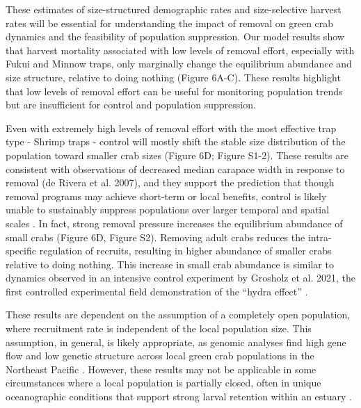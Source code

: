 \documentclass{article}
\begin{document}
These estimates of size-structured demographic rates and size-selective harvest rates will be essential for understanding the impact of removal on green crab dynamics and the feasibility of population suppression. Our model results show that harvest mortality associated with low levels of removal effort, especially with Fukui and Minnow traps, only marginally change the equilibrium abundance and size structure, relative to doing nothing (Figure 6A-C). These results highlight that low levels of removal effort can be useful for monitoring population trends but are insufficient for control and population suppression.

Even with extremely high levels of removal effort with the most effective trap type - Shrimp traps - control will mostly shift the stable size distribution of the population toward smaller crab sizes (Figure 6D; Figure S1-2). These results are consistent with observations of decreased median carapace width in response to removal (de Rivera et al. 2007), and they support the prediction that though removal programs may achieve short-term or local benefits, control is likely unable to sustainably suppress populations over larger temporal and spatial scales \parencite{keller2025transition, tummon2024rebound, kanary2014modelling}. In fact, strong removal pressure increases the equilibrium abundance of small crabs (Figure 6D, Figure S2). Removing adult crabs reduces the intra-specific regulation of recruits, resulting in higher abundance of smaller crabs relative to doing nothing. This increase in small crab abundance is similar to dynamics observed in an intensive control experiment by Grosholz et al. 2021, the first controlled experimental field demonstration of the “hydra effect” \parencite{grosholz2021stage}.

These results are dependent on the assumption of a completely open population, where recruitment rate is independent of the local population size. This assumption, in general, is likely appropriate, as genomic analyses find high gene flow and low genetic structure across local green crab populations in the Northeast Pacific \parencite{tepolt2009european, tepolt2022balanced}. However, these results may not be applicable in some circumstances where a local population is partially closed, often in unique oceanographic conditions that support strong larval retention within an estuary \parencite{grosholz2021stage}. 
\end{document}
